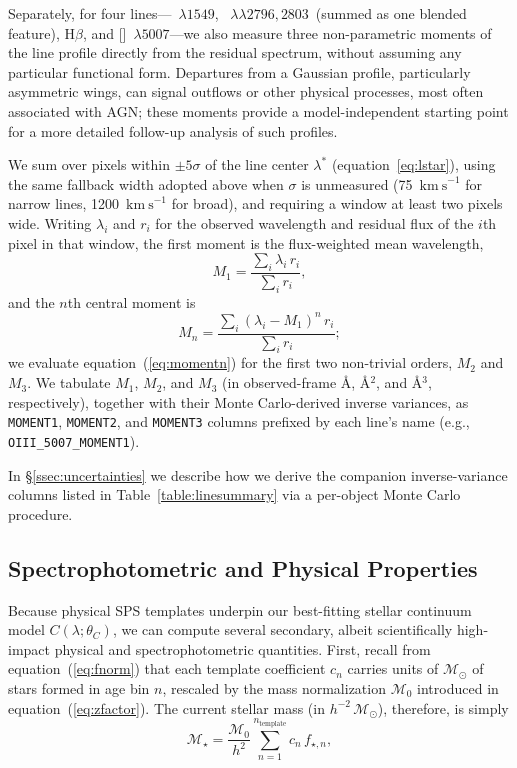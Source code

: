\documentclass[modern,linenumbers]{aastex702}
\newcommand{\kms}{\ensuremath{\mathrm{km~s}^{-1}}}
\newcommand{\hb}{\ensuremath{\mathrm{H}\beta}}
\newcommand{\oiiilam}{[\ion{O}{3}]~$\lambda5007$}
\newcommand{\mgiidoublet}{\ion{Mg}{2}~$\lambda\lambda2796,2803$}
\newcommand{\Mstar}{\ensuremath{\mathcal{M}_{\star}}}
\newcommand{\msun}{\ensuremath{\mathcal{M}_{\odot}}}
\begin{document}
Separately, for four lines—~$\lambda1549$, \mgiidoublet\ (summed
as one blended feature), \hb, and \oiiilam—we also measure three
non-parametric moments of the line profile directly from the residual
spectrum, without assuming any particular functional form. Departures
from a Gaussian profile, particularly asymmetric wings, can signal
outflows or other physical processes, most often associated with AGN;
these moments provide a model-independent starting point for a more
detailed follow-up analysis of such profiles.

We sum over pixels within $\pm5\sigma$ of the line center $\lambda^*$
(equation~\ref{eq:lstar}), using the same fallback width adopted above
when $\sigma$ is unmeasured (75~\kms{} for narrow lines, 1200~\kms{} for
broad), and requiring a window at least two pixels wide. Writing
$\lambda_i$ and $r_i$ for the observed wavelength and residual flux of
the $i$th pixel in that window, the first moment is the flux-weighted
mean wavelength,
\begin{equation}
  M_1 = \frac{\sum_i \lambda_i\,r_i}{\sum_i r_i},
  \label{eq:moment1}
\end{equation}
and the $n$th central moment is
\begin{equation}
  M_n = \frac{\sum_i (\lambda_i-M_1)^n\,r_i}{\sum_i r_i};
  \label{eq:momentn}
\end{equation}
we evaluate equation~(\ref{eq:momentn}) for the first two non-trivial
orders, $M_2$ and $M_3$. We tabulate $M_1$, $M_2$, and $M_3$ (in
observed-frame \AA, \AA$^2$, and \AA$^3$, respectively), together with
their Monte Carlo-derived inverse variances, as \texttt{MOMENT1},
\texttt{MOMENT2}, and \texttt{MOMENT3} columns prefixed by each line's
name (e.g., \texttt{OIII\_5007\_MOMENT1}).

In \S\ref{ssec:uncertainties} we describe how we derive
the companion inverse-variance columns listed in
Table~\ref{table:linesummary} via a per-object Monte Carlo procedure.

\subsection{Spectrophotometric and Physical Properties}
\label{ssec:quantities}

Because physical SPS templates underpin our best-fitting stellar
continuum model $C(\lambda;\theta_C)$, we can compute several
secondary, albeit scientifically high-impact physical and
spectrophotometric quantities. First, recall from
equation~(\ref{eq:fnorm}) that each template coefficient $c_n$ carries
units of \msun{} of stars formed in age bin $n$, rescaled by the mass
normalization $\mathcal{M}_0$ introduced in
equation~(\ref{eq:zfactor}). The current stellar mass (in
$h^{-2}\,\msun$), therefore, is simply
\begin{equation}
  \Mstar = \frac{\mathcal{M}_0}{h^2}\sum_{n=1}^{n_\mathrm{template}} c_n\,f_{\star,n},
  \label{eq:mstar}
\end{equation}
\end{document}
